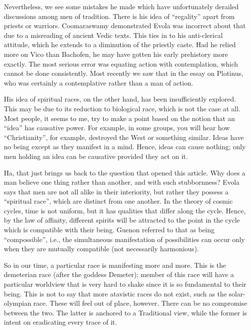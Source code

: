 Nevertheless, we see some mistakes he made which have unfortunately derailed discussions among men of tradition. There is his idea of ``regality'' apart from priests or warriors. Coomaraswamy demonstrated Evola was incorrect about that due to a misreading of ancient Vedic texts. This ties in to his anti-clerical attitude, which he extends to a diminution of the priestly caste. Had he relied more on Vico than Bachofen, he may have gotten his early prehistory more exactly. The most serious error was equating action with contemplation, which cannot be done consistently. Most recently we saw that in the essay on Plotinus, who was certainly a contemplative rather than a man of action.

His idea of spiritual races, on the other hand, has been insufficiently explored. This may be due to its reduction to biological race, which is not the case at all. Most people, it seems to me, try to make a point based on the notion that an ``idea'' has causative power. For example, in some groups, you will hear how ``Christianity'', for example, destroyed the West or something similar. Ideas have no being except as they manifest in a mind. Hence, ideas can cause nothing; only men holding an idea can be causative provided they act on it.

Ha, that just brings us back to the question that opened this article. Why does a man believe one thing rather than another, and with such stubbornness? Evola says that men are not all alike in their interiority, but rather they possess a ``spiritual race'', which are distinct from one another. In the theory of cosmic cycles, time is not uniform, but it has qualities that differ along the cycle. Hence, by the law of affinity, different spirits will be attracted to the point in the cycle which is compatible with their being. Guenon referred to that as being ``compossible'', i.e., the simultaneous manifestation of possibilities can occur only when they are mutually compatible (not necessarily harmonious).

So in our time, a particular race is manifesting more and more. This is the demeterian race (after the goddess Demeter); member of this race will have a particular worldview that is very hard to shake since it is so fundamental to their being. This is not to say that more atavistic races do not exist, such as the solar-olympian race. These will feel out of place, however. There can be no compromise between the two. The latter is anchored to a Traditional view, while the former is intent on eradicating every trace of it.

